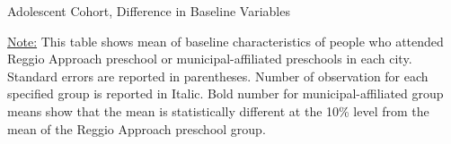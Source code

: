     
\begin{table}[H] \caption{Adolescent Cohort, Difference in Baseline Variables} \label{apptab:munivsaffi-adol}
	\scalebox{0.8}{
	}
	\footnotesize\raggedright{\underline{Note:} This table shows mean of baseline characteristics of people who attended Reggio Approach preschool or municipal-affiliated preschools in each city. Standard errors are reported in parentheses. Number of observation for each specified group is reported in Italic. Bold number for municipal-affiliated group means show that the mean is statistically different at the 10\% level from the mean of the Reggio Approach preschool group.}
\end{table}
        